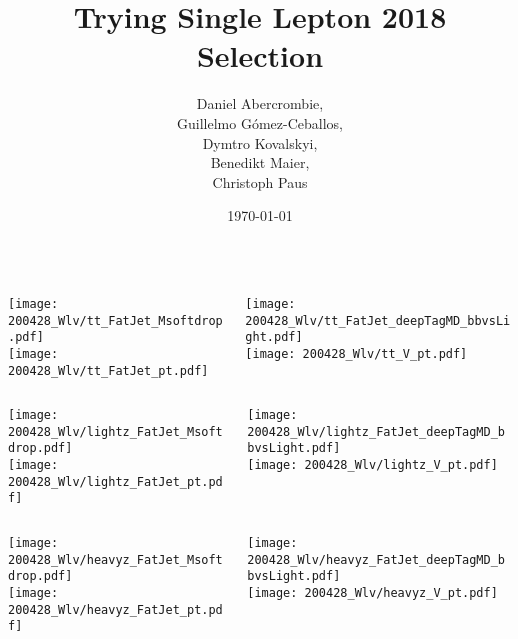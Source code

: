 \documentclass{beamer}
\author[D. Abercrombie]{
  Daniel Abercrombie, \\
  Guillelmo G\'omez-Ceballos, \\
  Dymtro Kovalskyi, \\
  Benedikt Maier, \\
  Christoph Paus
}
\title{\bf \sffamily Trying Single Lepton 2018 Selection}
\date{\today}
\begin{document}
\begin{frame}
  \titlepage
\end{frame}

\begin{frame}
  \begin{columns}
    \begin{column}{0.3\linewidth}
      \centering
      \texttt{[image: 200428\_Wlv/tt\_FatJet\_Msoftdrop.pdf]} \\
      \texttt{[image: 200428\_Wlv/tt\_FatJet\_pt.pdf]}
    \end{column}
    \begin{column}{0.3\linewidth}
      \centering
      \texttt{[image: 200428\_Wlv/tt\_FatJet\_deepTagMD\_bbvsLight.pdf]} \\
      \texttt{[image: 200428\_Wlv/tt\_V\_pt.pdf]}
    \end{column}
  \end{columns}
\end{frame}

\begin{frame}
  \begin{columns}
    \begin{column}{0.3\linewidth}
      \centering
      \texttt{[image: 200428\_Wlv/lightz\_FatJet\_Msoftdrop.pdf]} \\
      \texttt{[image: 200428\_Wlv/lightz\_FatJet\_pt.pdf]}
    \end{column}
    \begin{column}{0.3\linewidth}
      \centering
      \texttt{[image: 200428\_Wlv/lightz\_FatJet\_deepTagMD\_bbvsLight.pdf]} \\
      \texttt{[image: 200428\_Wlv/lightz\_V\_pt.pdf]}
    \end{column}
  \end{columns}
\end{frame}

\begin{frame}
  \begin{columns}
    \begin{column}{0.3\linewidth}
      \centering
      \texttt{[image: 200428\_Wlv/heavyz\_FatJet\_Msoftdrop.pdf]} \\
      \texttt{[image: 200428\_Wlv/heavyz\_FatJet\_pt.pdf]}
    \end{column}
    \begin{column}{0.3\linewidth}
      \centering
      \texttt{[image: 200428\_Wlv/heavyz\_FatJet\_deepTagMD\_bbvsLight.pdf]} \\
      \texttt{[image: 200428\_Wlv/heavyz\_V\_pt.pdf]}
    \end{column}
  \end{columns}
\end{frame}
\end{document}
